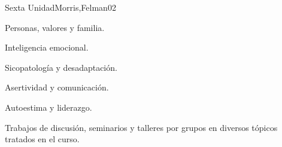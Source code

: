 \begin{syllabus}
\begin{unit}{Sexta Unidad}{Morris,Felman}{0}{2}
\begin{topics}
	\item Personas, valores y familia.
	\item Inteligencia emocional.
	\item Sicopatología y desadaptación.
	\item Asertividad y comunicación.
	\item Autoestima y liderazgo.
\end{topics}
\begin{learningoutcomes}
	\item Trabajos de discusión, seminarios y talleres por grupos en diversos tópicos tratados en el curso.
\end{learningoutcomes}
\end{unit}



\begin{coursebibliography}
\end{coursebibliography}

\end{syllabus}
